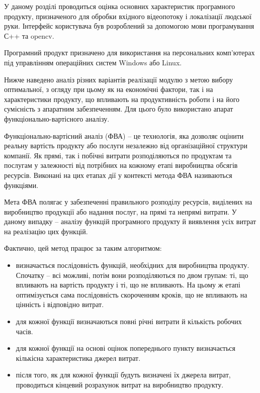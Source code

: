 
У даному розділі проводиться оцінка основних характеристик програмного продукту, призначеного для обробки вхідного відеопотоку і локалізації людської руки. Інтерфейс користувача був розроблений за допомогою мови програмування С++ та opencv.

Програмний продукт призначено для використання на персональних комп’ютерах під управлінням операційних систем Windows або Linux.

Нижче наведено аналіз різних варіантів реалізації модулю з метою вибору оптимальної, з огляду при цьому як на економічні фактори, так і на характеристики продукту, що впливають на продуктивність роботи і на його сумісність з апаратним забезпеченням. Для цього було використано апарат функціонально-вартісного аналізу.

Функціонально-вартісний аналіз (ФВА) -- це технологія, яка дозволяє оцінити реальну вартість продукту або послуги незалежно від організаційної структури компанії. Як прямі, так і побічні витрати розподіляються по продуктам та послугам у залежності від потрібних на кожному етапі виробництва обсягів ресурсів. Виконані на цих етапах дії у контексті метода ФВА називаються функціями.

Мета ФВА полягає у забезпеченні правильного розподілу ресурсів, виділених на виробництво продукції або надання послуг, на прямі та непрямі витрати. У даному випадку -- аналізу функцій програмного продукту й виявлення усіх витрат на реалізацію цих функцій. 

Фактично, цей метод працює за таким алгоритмом:
\begin{itemize}
	\item визначається послідовність функцій, необхідних для виробництва продукту. Спочатку -- всі можливі, потім вони розподіляються по двом групам: ті, що впливають на вартість продукту і ті, що не впливають. На цьому ж етапі оптимізується сама послідовність скороченням кроків, що не впливають на цінність і відповідно витрат.
	\item для кожної функції визначаються повні річні витрати й кількість робочих часів.
	\item для кожної функції на основі оцінок попереднього пункту визначається кількісна характеристика джерел витрат.
	\item після того, як для кожної функції будуть визначені їх джерела витрат, проводиться кінцевий розрахунок витрат на виробництво продукту.
\end{itemize}